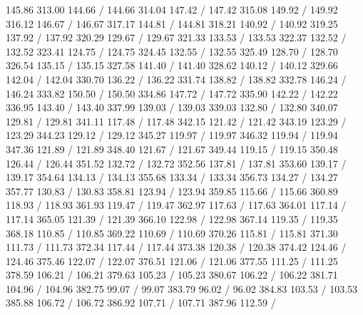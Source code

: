 { 145.86 313.00 144.66 /
 144.66 314.04 147.42 /
 147.42 315.08 149.92 /
 149.92 316.12 146.67 /
 146.67 317.17 144.81 /
 144.81 318.21 140.92 /
 140.92 319.25 137.92 /
 137.92 320.29 129.67 /
 129.67 321.33 133.53 /
 133.53 322.37 132.52 /
 132.52 323.41 124.75 /
 124.75 324.45 132.55 /
 132.55 325.49 128.70 /
 128.70 326.54 135.15 /
 135.15 327.58 141.40 /
 141.40 328.62 140.12 /
 140.12 329.66 142.04 /
 142.04 330.70 136.22 /
 136.22 331.74 138.82 /
 138.82 332.78 146.24 /
 146.24 333.82 150.50 /
 150.50 334.86 147.72 /
 147.72 335.90 142.22 /
 142.22 336.95 143.40 /
 143.40 337.99 139.03 /
 139.03 339.03 132.80 /
 132.80 340.07 129.81 /
 129.81 341.11 117.48 /
 117.48 342.15 121.42 /
 121.42 343.19 123.29 /
 123.29 344.23 129.12 /
 129.12 345.27 119.97 /
 119.97 346.32 119.94 /
 119.94 347.36 121.89 /
 121.89 348.40 121.67 /
 121.67 349.44 119.15 /
 119.15 350.48 126.44 /
 126.44 351.52 132.72 /
 132.72 352.56 137.81 /
 137.81 353.60 139.17 /
 139.17 354.64 134.13 /
 134.13 355.68 133.34 /
 133.34 356.73 134.27 /
 134.27 357.77 130.83 /
 130.83 358.81 123.94 /
 123.94 359.85 115.66 /
 115.66 360.89 118.93 /
 118.93 361.93 119.47 /
 119.47 362.97 117.63 /
 117.63 364.01 117.14 /
 117.14 365.05 121.39 /
 121.39 366.10 122.98 /
 122.98 367.14 119.35 /
 119.35 368.18 110.85 /
 110.85 369.22 110.69 /
 110.69 370.26 115.81 /
 115.81 371.30 111.73 /
 111.73 372.34 117.44 /
 117.44 373.38 120.38 /
 120.38 374.42 124.46 /
 124.46 375.46 122.07 /
 122.07 376.51 121.06 /
 121.06 377.55 111.25 /
 111.25 378.59 106.21 /
 106.21 379.63 105.23 /
 105.23 380.67 106.22 /
 106.22 381.71 104.96 /
 104.96 382.75 99.07 /
 99.07 383.79 96.02 /
 96.02 384.83 103.53 /
 103.53 385.88 106.72 /
 106.72 386.92 107.71 /
 107.71 387.96 112.59 /
}
